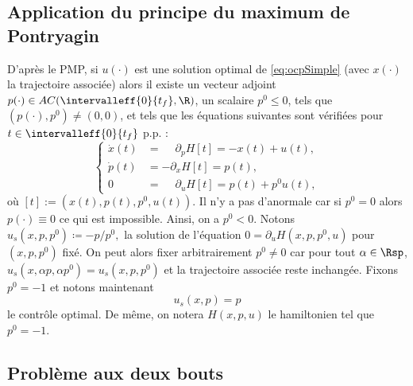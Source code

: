 \subsection{Application du principe du maximum de Pontryagin}

    D'apr\`es le PMP, si $u(\cdot)$ est une solution optimal de \eqref{eq:ocpSimple} (avec $x(\cdot)$ la trajectoire associ\'ee)
    alors il existe un vecteur adjoint $p(\cdot) \in AC(\intervalleff{0}{t_f},\R)$, un scalaire $p^0 \le 0$, tels que $(p(\cdot),p^0) \ne (0,0)$,
    et tels que les \'equations suivantes sont v\'erifi\'ees pour $t\in\intervalleff{0}{t_f}$ p.p. :
    \begin{equation*}
        \left\{ 
            \begin{array}{ll}
                \dot{x}(t)  & = \phantom{-} \partial_p H[t] = -x(t)+u(t),   \\[0.5em]
                \dot{p}(t)  & = -           \partial_x H[t] = p(t),         \\[0.5em]
                0           & = \phantom{-} \partial_u H[t] = p(t)+p^0 u(t),
            \end{array}
        \right. 
    \end{equation*}
    o\`u $[t] := (x(t),p(t),p^0,u(t))$.
    Il n'y a pas d'anormale car si $p^0=0$ alors $p(\cdot)\equiv0$ ce qui est impossible. Ainsi, on a $p^0 < 0$.
%
    Notons 
    $
        u_s(x,p,p^0) \coloneqq - p/p^0,
    $
    la solution de l'\'equation $0 = \partial_u H(x,p,p^0,u)$ pour $(x,p,p^0)$ fix\'e.
    On peut alors fixer arbitrairement $p^0\ne 0$ car pour tout $\alpha \in \Rsp$, $u_s(x,\alpha p, \alpha p^0) = u_s(x,p,p^0)$ et la trajectoire
    associ\'ee reste inchang\'ee. Fixons $p^0 = -1$ et notons maintenant
    \begin{equation*}
        u_s(x,p) = p
    \end{equation*}
    le contr\^ole optimal. De m\^eme, on notera $H(x,p,u)$ le hamiltonien tel que $p^0= -1$.

\subsection{Probl\`eme aux deux bouts}

